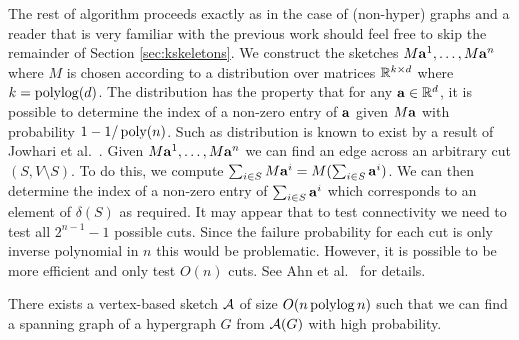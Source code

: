 The rest of algorithm proceeds exactly as in the case of (non-hyper) graphs \cite{AhnGM12a} and a reader that is very familiar with the previous work should feel free to skip the remainder of Section \ref{sec:kskeletons}. We construct the sketches $M\mathbf{a}^1,  \ldots, M\mathbf{a}^n$ 
where $M$ is chosen according to a distribution over matrices ${\mathbb R}^{k \times d}$ where $k=\operatorname{polylog} (d)$. The distribution has the property that for any $\mathbf{a}\in {\mathbb R}^d$, it is possible to determine the index of a non-zero entry of $\mathbf{a}$ given $M\mathbf{a}$ with probability $1-1/\operatorname{poly}(n)$. Such as distribution is known to exist by a result of Jowhari et al.~\cite{JowhariST11}.
%
%
Given $M\mathbf{a}^1,  \ldots, M\mathbf{a}^n$ we can find an edge across an arbitrary cut $(S,V\setminus S)$. To do this, we compute $\sum_{i\in S} M\mathbf{a}^i=M( \sum_{i\in S} \mathbf{a}^i)$. We can then determine the index of a non-zero entry of $\sum_{i\in S} \mathbf{a}^i$ which corresponds to an element of $\delta(S)$ as required. It may appear that to test connectivity we need to test all $2^{n-1}-1$ possible cuts. Since the failure probability for each cut is only inverse polynomial in $n$ this would be problematic. However, it is possible to be more efficient and only test $O(n)$ cuts. See Ahn et al.~\cite{AhnGM12a} for details.

\begin{theorem}
There exists a vertex-based sketch ${\cal A}$ of size $O(n\operatorname{polylog} n)$ such that we can find a spanning graph of a hypergraph $G$ from ${\cal A}(G)$ with high probability.
\end{theorem}

